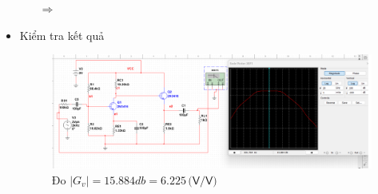 \begin{itemize}[label=-]
\begin{itemize}[label=+, leftmargin=2cm]
		$\Rightarrow$ 
	\end{itemize}
	\item Kiểm tra kết quả
	
	\begin{figure}[H]
		\centering
		\includegraphics[width=.8\linewidth]{./my-chapters/my-images/Question9/d_result.png}
		\caption{Đo $|G_{v}| = 15.884db = 6.225 \,\textsf{(V/V)}$}
	\end{figure}
\end{itemize}

